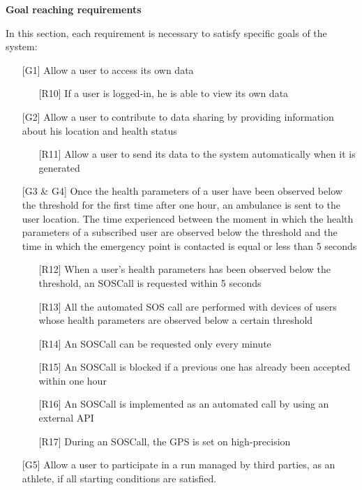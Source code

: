 \textbf{Goal reaching requirements}
\par
In this section, each requirement is necessary to satisfy specific goals of the system:
\begin{itemize}
\item [{[G1]}] Allow a user to access its own data
	\begin{itemize}
	\item[{[R10]}] If a user is logged-in, he is able to view its own data
	\end{itemize}
\item[{[G2]}] Allow a user to contribute to data sharing by providing information about his location and health status
	\begin{itemize}
	\item[{[R11]}] Allow a user to send its data to the system automatically when it is generated
	\end{itemize}
\item[{[G3 \& G4]}] Once the health parameters of a user have been observed 
below the threshold for the first time after one hour, an ambulance is sent to the user location. 
The time experienced between the moment in which the health parameters of a subscribed user are observed below the threshold and the time in which the emergency point is contacted is equal or less than 5 seconds
	\begin{itemize}
	\item[{[R12]}] When a user's health parameters has been observed below the threshold, an SOSCall is requested within 5 seconds
	\item[{[R13]}] All the automated SOS call are performed with devices of users whose health parameters are observed below a certain threshold
	\item[{[R14]}] An SOSCall can be requested only every minute
	\item[{[R15]}] An SOSCall is blocked if a previous one has already been accepted within one hour
	\item[{[R16]}] An SOSCall is implemented as an automated call by using an external API
	\item[{[R17]}] During an SOSCall, the GPS is set on high-precision
	\end{itemize}
\item[{[G5]}] Allow a user to participate in a run managed by third parties, as an athlete, if all starting conditions are satisfied.
	\begin{itemize}


\end{itemize}
\end{itemize}
